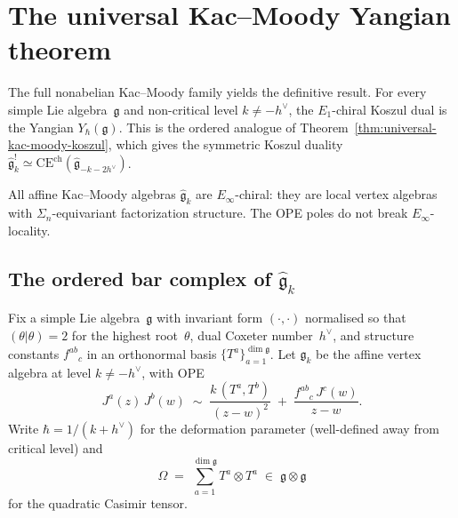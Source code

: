 \section{The universal Kac--Moody Yangian theorem}
\label{sec:km-yangian}

The full nonabelian Kac--Moody family yields the definitive result. For every simple Lie algebra~$\mathfrak{g}$
and non-critical level $k\neq -h^\vee$, the $E_1$-chiral Koszul
dual is the Yangian $Y_\hbar(\mathfrak{g})$. This is the
ordered analogue of Theorem~\ref{thm:universal-kac-moody-koszul},
which gives the symmetric Koszul duality
$\widehat{\mathfrak{g}}_k^!\simeq
\mathrm{CE}^{\mathrm{ch}}(\widehat{\mathfrak{g}}_{-k-2h^\vee})$.

All affine Kac--Moody algebras $\widehat{\mathfrak{g}}_k$ are
$E_\infty$-chiral: they are local vertex algebras with
$\Sigma_n$-equivariant factorization structure. The OPE poles
do not break $E_\infty$-locality.

\subsection{The ordered bar complex of
$\widehat{\mathfrak{g}}_k$}
\label{subsec:km-ordered-bar}

Fix a simple Lie algebra~$\mathfrak{g}$ with invariant form
$(\cdot,\cdot)$ normalised so that $(\theta|\theta)=2$
for the highest root~$\theta$, dual Coxeter number~$h^\vee$,
and structure constants $f^{ab}{}_{c}$ in an orthonormal basis
$\{T^a\}_{a=1}^{\dim\mathfrak{g}}$.
Let $\widehat{\mathfrak{g}}_k$ be the affine vertex algebra at
level $k\neq -h^\vee$, with OPE
\begin{equation}\label{eq:km-ope-ordered}
J^a(z)\,J^b(w)
\;\sim\;
\frac{k\,(T^a,T^b)}{(z-w)^2}
\;+\;
\frac{f^{ab}{}_{c}\,J^c(w)}{z-w}.
\end{equation}
Write $\hbar = 1/(k+h^\vee)$ for the deformation parameter
(well-defined away from critical level) and
\[
\Omega
\;=\;
\sum_{a=1}^{\dim\mathfrak{g}} T^a\otimes T^a
\;\in\;
\mathfrak{g}\otimes\mathfrak{g}
\]
for the quadratic Casimir tensor.

